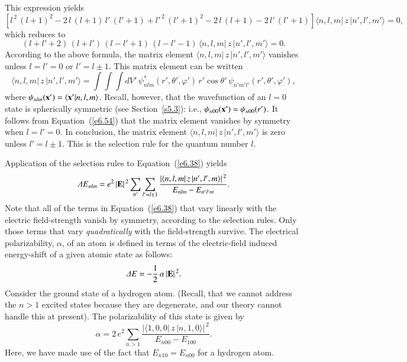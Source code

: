 This expression yields
\begin{equation}
\left[l^{\,2}\, (l+1)^2 - 2\, l\,(l+1)\,l'\,(l'+1) + l'^{\,2}\,(l'+1)^2 - 2\, l\,(l+1)
- 2\,l'\,(l'+1)\right] \langle n,l,m|\,z\,|n',l',m' \rangle = 0,
\end{equation}
which reduces to
\begin{equation}
(l+l'+2)\,(l+l')\,(l-l'+1)\,(l-l'-1)\,\langle n,l,m|\,z\,| n',l',m' \rangle = 0.
\end{equation}
According to the above formula, the matrix element 
$\langle n,l,m|\,z\,| n',l',m' \rangle$
vanishes unless $l=l'=0$ or $l' = l\pm 1$. This matrix element can be written
\begin{equation}\label{e6.54}
\langle n,l,m|\,z\,| n',l',m' \rangle = \int\!\int\!\int dV'\,
 \psi^\ast_{nlm}(r',\theta',\varphi')\,
r'\cos\theta'\, \psi_{n'm'l'}(r',\theta',\varphi'),
\end{equation}
where $\psi_{nlm}({\bf x}') = \langle {\bf x}'|n,l,m\rangle$. Recall, however,
that the wavefunction of an $l=0$ state is spherically symmetric (see Section~\ref{s5.3}):
{\rm i.e.}, $\psi_{n00}({\bf x}') = \psi_{n00}(r')$. It follows from Equation~(\ref{e6.54})
that the matrix element
vanishes by symmetry when $l=l'=0$. In conclusion, the matrix element
$\langle n,l,m|\,z\,| n',l',m' \rangle$ is zero unless $l'=l\pm 1$. This is
 the selection rule for the quantum number $l$. 

Application of the selection rules to Equation~(\ref{e6.38}) yields
\begin{equation}
{\mit\Delta} E_{nlm} = e^2 \,|{\bf E}|^{\,2} \sum_{n'}\sum_{l'=l\pm 1}
\frac{|\langle n,l,m|\,z\,|n',l',m\rangle|^{\,2}}{E_{nlm} - E_{n'l' m}}.
\end{equation}
Note that all of the terms in Equation~(\ref{e6.38}) that vary linearly with
 the electric field-strength
vanish by symmetry, according to the selection rules.
 Only those terms that  vary {\em quadratically}\/ with the
field-strength survive. The electrical polarizability, $\alpha$, of an atom is defined in terms 
of the electric-field induced energy-shift of a given atomic state as follows:
\begin{equation}
{\mit\Delta} E = - \frac{1}{2} \,\alpha \,|{\bf E}|^{\,2}.
\end{equation}
Consider the ground state of a hydrogen atom. (Recall, that we cannot address
the $n>1$ excited states because they are degenerate, and our theory cannot
handle this at present). The polarizability  of this state is given by
\begin{equation}
\alpha = 2 \,e^2  \sum_{n>1} 
\frac{|\langle 1,0,0|\,z\,|n,1,0\rangle|^{\,2}}{E_{n00}-E_{100}}.
\end{equation}
Here, we have made use of the fact that $E_{n10} = E_{n00}$ for a hydrogen atom.

